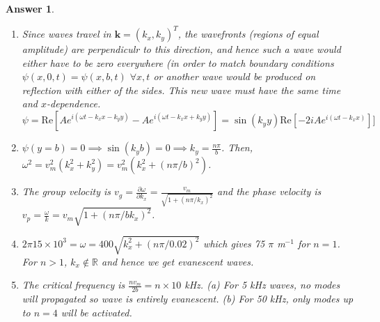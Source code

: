 \documentclass[a4paper]{article}
\newtheorem{ans}{Answer}[subsection]
\theoremstyle{new}
\begin{document}
\begin{ans}\leavevmode
\begin{enumerate}[label=(\roman*)]
\item Since waves travel in $\mathbf{k}=(k_x,k_y)^T$, the wavefronts (regions of equal amplitude) are perpendiculr to this direction, and hence such a wave would either have to be zero everywhere (in order to match boundary conditions $\psi(x,0,t)=\psi(x,b,t)$ $\forall x,t$ or another wave would be produced on reflection with either of the sides. This new wave must have the same time and $x$-dependence. 
$$\psi=\text{Re}[Ae^{i(\omega t-k_xx-k_yy)}-Ae^{i(\omega t-k_xx+k_yy)}]=\sin(k_yy)\text{Re}[-2iAe^{i(\omega t-k_xx)}]]$$
\item $\psi(y=b)=0\implies\sin(k_yb)=0\implies k_y=\frac{n\pi}{b}$. Then, $\omega^2=v_m^2(k_x^2+k_y^2)=v_m^2(k_x^2+(n\pi/b)^2)$.
\item The group velocity is $v_g=\frac{\partial\omega}{\partial k_x}=\frac{v_m}{\sqrt{1+(n\pi/k_x)^2}}$ and the phase velocity is $v_p=\frac{\omega}{k}=v_m\sqrt{1+(n\pi/bk_x)^2}$.
\item $2\pi 15\times10^3=\omega=400\sqrt{k_x^2+(n\pi/0.02)^2}$ which gives 75 $\pi$ m$^{-1}$ for $n=1$. For $n>1$, $k_x\notin\mathbb{R}$ and hence we get evanescent waves.
\item The critical frequency is $\frac{nv_m}{2b}=n\times 10$ kHz. (a) For 5 kHz waves, no modes will propagated so wave is entirely evanescent. (b) For 50 kHz, only modes up to $n=4$ will be activated.
\end{enumerate}
\end{ans}
\newpage
\end{document}
